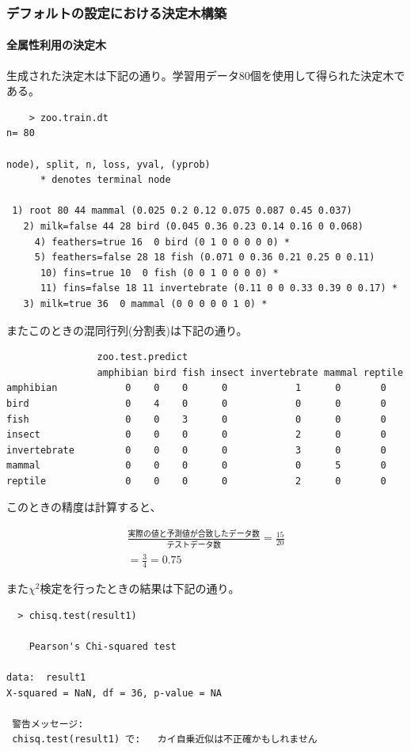 \documentclass[dvipdfmx]{jsarticle}
\begin{document}
\subsubsection{デフォルトの設定における決定木構築}
\paragraph{全属性利用の決定木}\par
生成された決定木は下記の通り。学習用データ80個を使用して得られた決定木である。
\begin{center}
  \begin{verbatim}
    > zoo.train.dt
n= 80

node), split, n, loss, yval, (yprob)
      * denotes terminal node

 1) root 80 44 mammal (0.025 0.2 0.12 0.075 0.087 0.45 0.037)
   2) milk=false 44 28 bird (0.045 0.36 0.23 0.14 0.16 0 0.068)
     4) feathers=true 16  0 bird (0 1 0 0 0 0 0) *
     5) feathers=false 28 18 fish (0.071 0 0.36 0.21 0.25 0 0.11)
      10) fins=true 10  0 fish (0 0 1 0 0 0 0) *
      11) fins=false 18 11 invertebrate (0.11 0 0 0.33 0.39 0 0.17) *
   3) milk=true 36  0 mammal (0 0 0 0 0 1 0) *
  \end{verbatim}
\end{center}
またこのときの混同行列(分割表)は下記の通り。
\begin{verbatim}
                zoo.test.predict
                amphibian bird fish insect invertebrate mammal reptile
amphibian            0    0    0      0            1      0       0
bird                 0    4    0      0            0      0       0
fish                 0    0    3      0            0      0       0
insect               0    0    0      0            2      0       0
invertebrate         0    0    0      0            3      0       0
mammal               0    0    0      0            0      5       0
reptile              0    0    0      0            2      0       0
\end{verbatim}
このときの精度は計算すると、
\begin{center}
  \begin{align*}
    \frac{実際の値と予測値が合致したデータ数}{テストデータ数} = \frac{15}{20} \\
    = \frac{3}{4} = 0.75
  \end{align*}
\end{center}
また$χ^{2}検定を行ったときの結果は下記の通り$。
\begin{verbatim}
  > chisq.test(result1)

	Pearson's Chi-squared test

data:  result1
X-squared = NaN, df = 36, p-value = NA

 警告メッセージ:
 chisq.test(result1) で:   カイ自乗近似は不正確かもしれません
\end{verbatim}
\end{document}
